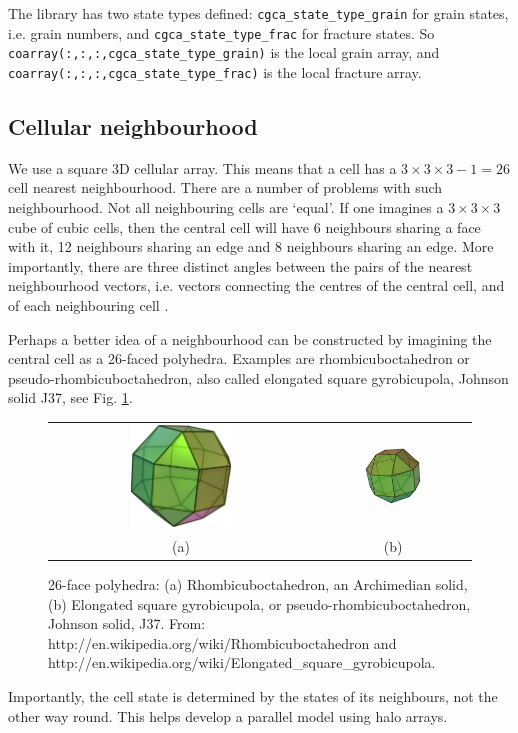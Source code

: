 The library has two state types defined:
\texttt{cgca\_state\_type\_grain} for grain states,
i.e. grain numbers, and
\texttt{cgca\_state\_type\_frac} for fracture states.
So \texttt{coarray(:,:,:,cgca\_state\_type\_grain)} is
the local grain array, and
\texttt{coarray(:,:,:,cgca\_state\_type\_frac)} is
the local fracture array.

\subsection{Cellular neighbourhood}

We use a square 3D cellular array.
This means that a cell has a
$3 \times 3 \times 3 - 1 = 26$
cell nearest neighbourhood.
There are a number of problems with such
neighbourhood.
Not all neighbouring cells are `equal'.
If one imagines a $3\times 3 \times 3$ cube
of cubic cells, then the central cell will
have 6 neighbours sharing a face with it,
12 neighbours sharing an edge and 8 neighbours
sharing an edge.
More importantly, there are
three distinct angles between the pairs of the
nearest neighbourhood vectors, i.e. vectors
connecting the centres of the central cell,
and of each neighbouring cell \cite{shterenlikht2013c}.

Perhaps a better idea of a neighbourhood can
be constructed by imagining the central cell
as a 26-faced polyhedra.
Examples are rhombicuboctahedron or
pseudo-rhombicuboctahedron, also called
elongated square gyrobicupola, Johnson solid
J37, see Fig. \ref{fig:j37}.

\begin{figure}
\begin{tabular}{cc}
\includegraphics[width=0.4\textwidth]{octa.jpg}
&
\includegraphics[width=0.4\textwidth]{gyro.png}
\\
(a) & (b)
\end{tabular}
\caption{
26-face polyhedra: (a) Rhombicuboctahedron, an Archimedian
solid, (b) Elongated square gyrobicupola, or
pseudo-rhombicuboctahedron, Johnson solid, J37.
From: http://en.wikipedia.org/wiki/Rhombicuboctahedron and
http://en.wikipedia.org/wiki/Elongated\_square\_gyrobicupola.
}
\label{fig:j37}
\end{figure}

Importantly, the cell state is determined
by the states of its neighbours, not the
other way round.
This helps develop a parallel model using
halo arrays.

